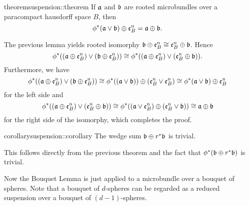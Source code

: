 \begin{mystatement}{theorem}{suspension::theorem}
    If $\mathfrak{a}$ and $\bb$ are rooted microbundles
    over a paracompact hausdorff space $B$, then
    \[ \whitney{\ind{\phi}(\ba \vee \bb)}{\be{B}} = \whitney{\ba}{\bb}. \]
\end{mystatement}

\begin{myproof}
    The previous lemma yields rooted isomorphy $\whitney{\bb}{\be{B}} \cong \whitney{\be{B}}{\bb}$.
    Hence
    \[
        \ind{\phi}((\whitney{\ba}{\be{B}}) \vee (\whitney{\bb}{\be{B}}))
        \cong \ind{\phi}((\whitney{\ba}{\be{B}}) \vee (\whitney{\be{B}}{\bb})).
    \]
    Furthermore, we have
    \[
        \ind{\phi}((\whitney{\ba}{\be{B}}) \vee (\whitney{\bb}{\be{B}})) \cong
        \whitney{\ind{\phi}((\ba \vee \bb))}{(\be{B} \vee \be{B})}
        \cong \whitney{\ind{\phi}(\ba \vee \bb)}{\be{B}}
    \]
    for the left side and
    \[
        \ind{\phi}((\whitney{\ba}{\be{B}}) \vee (\whitney{\be{B}}{\bb})) \cong
        \ind{\phi}(\whitney{(\ba \vee \be{B})}{(\be{B} \vee \bb)})
        \cong \whitney{\ba}{\bb}
    \]
    for the right side of the isomorphy, which completes the proof.
\end{myproof}

\begin{mystatement}{corollary}{suspension::corollary}
    The wedge sum $\whitney{\bb}{\ind{r}\bb}$ is trivial.
\end{mystatement}

\begin{myproof}
    This follows directly from the previous theorem and
    the fact that $\ind{\phi}(\whitney{\bb}{\ind{r}\bb})$ is trivial.
\end{myproof}

\begin{myparagraph}
    Now the Bouquet Lemma is just  applied to
    a microbundle over a bouquet of spheres.
    Note that a bouquet of $d$-spheres can be regarded
    as a reduced suspension over a bouquet of $(d-1)$-spheres.
\end{myparagraph}